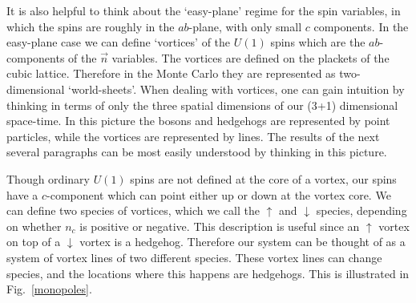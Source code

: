 \documentclass[prb,twocolumn]{revtex4-1}
\begin{document}
It is also helpful to think about the `easy-plane' regime for the spin variables, in which the spins are roughly in the $ab$-plane, with only small $c$ components. In the easy-plane case we can define `vortices' of the $U(1)$ spins which are the $ab$-components of the $\vec n$ variables. 
The vortices are defined on the plackets of the cubic lattice. Therefore in the Monte Carlo they are represented as two-dimensional `world-sheets'. When dealing with vortices, one can gain intuition by thinking in terms of only the three spatial dimensions of our (3+1) dimensional space-time. In this picture the bosons and hedgehogs are represented by point particles, while the vortices are represented by lines. The results of the next several paragraphs can be most easily understood by thinking in this picture.



Though ordinary $U(1)$ spins are not defined at the core of a vortex, our spins have a $c$-component which can point either up or down at the vortex core. We can define two species of vortices, which we call the $\uparrow$ and $\downarrow$ species, depending on whether $n_c$ is positive or negative. This description is useful since an $\uparrow$ vortex on top of a $\downarrow$ vortex is a hedgehog. Therefore our system can be thought of as a system of vortex lines of two different species. These vortex lines can change species, and the locations where this happens are hedgehogs. This is illustrated in Fig.~\ref{monopoles}.
\end{document}

